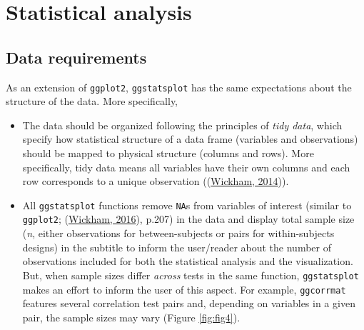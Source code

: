 \documentclass[
]{article}
\begin{document}
\hypertarget{statistical-analysis}{%
\section{Statistical analysis}\label{statistical-analysis}}

\hypertarget{data-requirements}{%
\subsection{Data requirements}\label{data-requirements}}

As an extension of \texttt{ggplot2}, \texttt{ggstatsplot} has the same expectations about the
structure of the data. More specifically,

\begin{itemize}
\item
  The data should be organized following the principles of \emph{tidy data}, which
  specify how statistical structure of a data frame (variables and
  observations) should be mapped to physical structure (columns and rows).
  More specifically, tidy data means all variables have their own columns and
  each row corresponds to a unique observation ((\protect\hyperlink{ref-wickhamTidyData2014}{Wickham, 2014})).
\item
  All \texttt{ggstatsplot} functions remove \texttt{NA}s from variables of interest (similar
  to \texttt{ggplot2}; (\protect\hyperlink{ref-wickhamGgplot2ElegantGraphics2016}{Wickham, 2016}), p.207) in the data and
  display total sample size (\emph{n}, either observations for between-subjects or
  pairs for within-subjects designs) in the subtitle to inform the user/reader
  about the number of observations included for both the statistical analysis
  and the visualization. But, when sample sizes differ \emph{across} tests in the
  same function, \texttt{ggstatsplot} makes an effort to inform the user of this
  aspect. For example, \texttt{ggcorrmat} features several correlation test pairs
  and, depending on variables in a given pair, the sample sizes may vary
  (Figure \ref{fig:fig4}).
\end{itemize}
\end{document}

